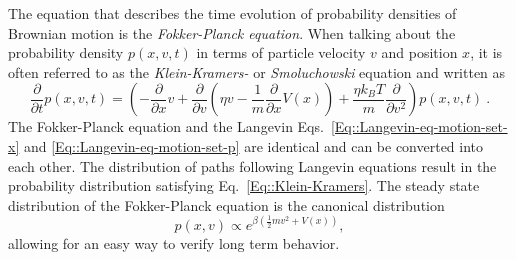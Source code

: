 	The equation that describes the time evolution of probability densities of Brownian motion is the \textit{Fokker-Planck equation}. When talking about the probability density $p(x, v, t)$ in terms of particle velocity $v$ and position $x$, it is often referred to as the \textit{Klein-Kramers-} or \textit{Smoluchowski} equation and written as
	\begin{equation} \label{Eq::Klein-Kramers}
		\frac{\partial}{\partial t} p(x, v, t) = \left(-\frac{\partial}{\partial x} v + \frac{\partial}{\partial v} \left(\eta v - \frac{1}{m} \frac{\partial}{\partial x} V(x) \right) + \frac{\eta k_B T}{m} \frac{\partial}{\partial v^2}\right)p(x, v, t) ~.
	\end{equation}
	The Fokker-Planck equation and the Langevin Eqs.~\eqref{Eq::Langevin-eq-motion-set-x} and \eqref{Eq::Langevin-eq-motion-set-p} are identical and can be converted into each other. The distribution of paths following Langevin equations result in the probability distribution satisfying Eq.~\eqref{Eq::Klein-Kramers}. The steady state distribution of the Fokker-Planck equation is the canonical distribution
	\begin{equation} \label{Eq::Canonical-Dist}
		p(x, v) \propto e^{\beta \left( \tfrac{1}{2} m v^2 + V(x)\right)},
	\end{equation}
	allowing for an easy way to verify long term behavior.
